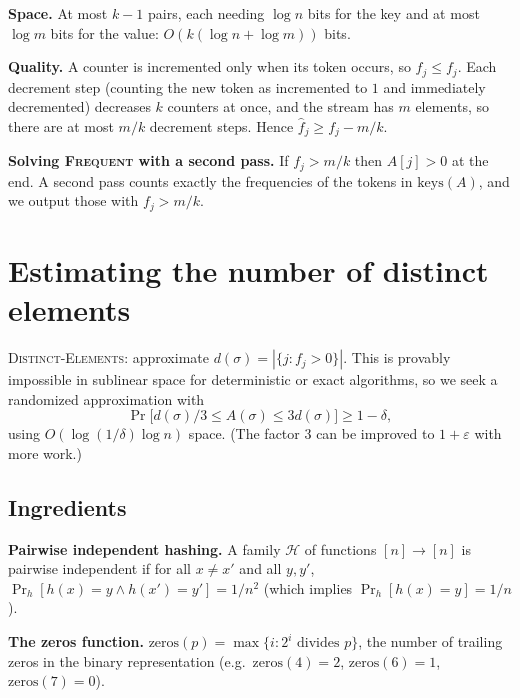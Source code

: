\textbf{Space.} At most $k-1$ pairs, each needing $\log n$ bits for the key and at most $\log m$ bits for the value: $O(k(\log n+\log m))$ bits.
 
\textbf{Quality.} A counter is incremented only when its token occurs, so $\hat f_j\le f_j$. Each decrement step (counting the new token as incremented to $1$ and immediately decremented) decreases $k$ counters at once, and the stream has $m$ elements, so there are at most $m/k$ decrement steps. Hence $\hat f_j\ge f_j-m/k$.
 
 
\textbf{Solving \textsc{Frequent} with a second pass.} If $f_j>m/k$ then $A[j]>0$ at the end. A second pass counts exactly the frequencies of the tokens in $\mathrm{keys}(A)$, and we output those with $f_j>m/k$.
 
\section{Estimating the number of distinct elements}
 
\textsc{Distinct-Elements}: approximate $d(\sigma)=|\{j:f_j>0\}|$. This is provably impossible in sublinear space for deterministic or exact algorithms, so we seek a randomized approximation with
\[
  \Pr\big[d(\sigma)/3\le A(\sigma)\le3d(\sigma)\big]\ge1-\delta,
\]
using $O(\log(1/\delta)\log n)$ space. (The factor $3$ can be improved to $1+\varepsilon$ with more work.)
 
\subsection{Ingredients}
 
\textbf{Pairwise independent hashing.} A family $\mathcal H$ of functions $[n]\to[n]$ is pairwise independent if for all $x\neq x'$ and all $y,y'$, $\Pr_{h}[h(x)=y\wedge h(x')=y']=1/n^2$ (which implies $\Pr_h[h(x)=y]=1/n$).
 
 
\textbf{The zeros function.} $\mathrm{zeros}(p)=\max\{i:2^i\text{ divides }p\}$, the number of trailing zeros in the binary representation (e.g.\ $\mathrm{zeros}(4)=2$, $\mathrm{zeros}(6)=1$, $\mathrm{zeros}(7)=0$).
 
